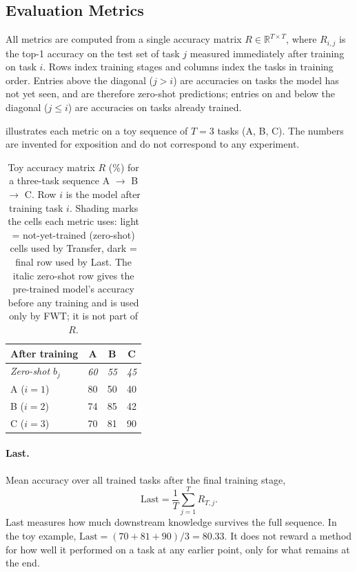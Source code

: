 
\subsection{Evaluation Metrics}
\label{sec:metrics}

All metrics are computed from a single accuracy matrix $R \in \mathbb{R}^{T \times T}$, where $R_{i,j}$ is the top-1 accuracy on the test set of task $j$ measured immediately after training on task $i$. Rows index training stages and columns index the tasks in training order. Entries above the diagonal ($j > i$) are accuracies on tasks the model has not yet seen, and are therefore zero-shot predictions; entries on and below the diagonal ($j \le i$) are accuracies on tasks already trained.

 illustrates each metric on a toy sequence of $T=3$ tasks (A, B, C). The numbers are invented for exposition and do not correspond to any experiment.

\begin{table}[h]
\centering
\caption{Toy accuracy matrix $R$ (\%) for a three-task sequence A $\to$ B $\to$ C. Row $i$ is the model after training task $i$. Shading marks the cells each metric uses: \colorbox{gray!15}{light} = not-yet-trained (zero-shot) cells used by Transfer, \colorbox{gray!40}{dark} = final row used by Last. The italic zero-shot row gives the pre-trained model's accuracy before any training and is used only by FWT; it is not part of $R$.}
\label{tab:toy_metrics}
\begin{tabular}{l ccc}
\toprule
After training & A & B & C \\
\midrule
\textit{Zero-shot $b_j$} & \textit{60} & \textit{55} & \textit{45} \\
\midrule
A ($i=1$) & 80 & \cellcolor{gray!15}50 & \cellcolor{gray!15}40 \\
B ($i=2$) & 74 & 85 & \cellcolor{gray!15}42 \\
C ($i=3$) & \cellcolor{gray!40}70 & \cellcolor{gray!40}81 & \cellcolor{gray!40}90 \\
\bottomrule
\end{tabular}
\end{table}

\paragraph{Last.} Mean accuracy over all trained tasks after the final training stage,
\begin{equation}
\text{Last} = \frac{1}{T}\sum_{j=1}^{T} R_{T,j}.
\end{equation}
Last measures how much downstream knowledge survives the full sequence. In the toy example, $\text{Last} = (70 + 81 + 90)/3 = 80.33$. It does not reward a method for how well it performed on a task at any earlier point, only for what remains at the end.


